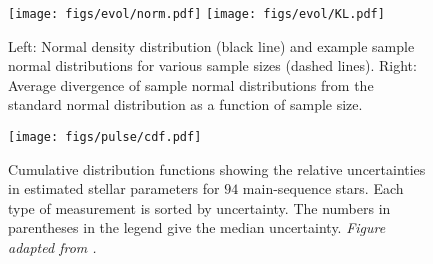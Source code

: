 \begin{figure}
    \centering
    \texttt{[image: figs/evol/norm.pdf]}%
    \texttt{[image: figs/evol/KL.pdf]}
    \caption[Relative entropy of sample normal distributions]{Left: Normal density distribution (black line) and example sample normal distributions for various sample sizes (dashed lines). 
    Right: Average divergence of sample normal distributions from the standard normal distribution as a function of sample size. 
    \label{fig:kl}}
\end{figure}

\begin{figure}
    \texttt{[image: figs/pulse/cdf.pdf]}
    \caption[Relative uncertainties in estimated stellar parameters]{Cumulative distribution functions showing the relative uncertainties in estimated stellar parameters for $94$ main-sequence stars. 
    Each type of measurement is sorted by uncertainty. 
    The numbers in parentheses in the legend give the median uncertainty. 
    \emph{Figure adapted from \citealt{2017EPJWC.16005003B}.}
    \label{fig:posterior-cdf}}
\end{figure}


